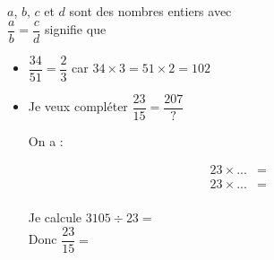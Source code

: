 \begin{myprop}
	$a$, $b$, $c$ et $d$  sont des nombres entiers avec \\
	
	$\dfrac{a}{b} = \dfrac{c}{d}$ signifie que  
	
	 
\end{myprop}


\begin{myexs}
	\begin{itemize}
		\item $\dfrac{34}{51} = \dfrac{2}{3}$ car $34 \times 3 = 51 \times 2 = 102$
		
		\item Je veux compléter $\dfrac{23}{15} = \dfrac{207}{?}$
		
		On a :
		
		\begin{eqnarray*}
			23 \times ... &=&  \\
			23 \times ... &=&  \\
		\end{eqnarray*}
		
		Je calcule $\num{3105} \div 23 =  $ \\
		
		Donc $\dfrac{23}{15} = $
	\end{itemize}
	
\end{myexs}